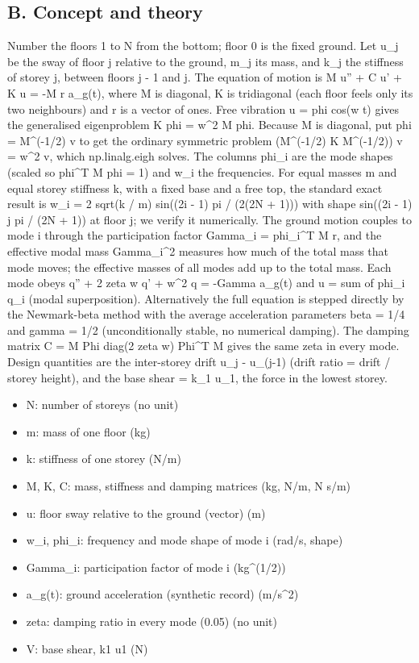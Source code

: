 \documentclass[11pt,a4paper]{article}
\begin{document}
\subsection*{B. Concept and theory}
Number the floors 1 to N from the bottom; floor 0 is the fixed ground. Let u\_j be the sway of floor j relative to the ground, m\_j its mass, and k\_j the stiffness of storey j, between floors j - 1 and j. The equation of motion is M u'' + C u' + K u = -M r a\_g(t), where M is diagonal, K is tridiagonal (each floor feels only its two neighbours) and r is a vector of ones. Free vibration u = phi cos(w t) gives the generalised eigenproblem K phi = w\textasciicircum{}2 M phi. Because M is diagonal, put phi = M\textasciicircum{}(-1/2) v to get the ordinary symmetric problem (M\textasciicircum{}(-1/2) K M\textasciicircum{}(-1/2)) v = w\textasciicircum{}2 v, which np.linalg.eigh solves. The columns phi\_i are the mode shapes (scaled so phi\textasciicircum{}T M phi = 1) and w\_i the frequencies. For equal masses m and equal storey stiffness k, with a fixed base and a free top, the standard exact result is w\_i = 2 sqrt(k / m) sin((2i - 1) pi / (2(2N + 1))) with shape sin((2i - 1) j pi / (2N + 1)) at floor j; we verify it numerically. The ground motion couples to mode i through the participation factor Gamma\_i = phi\_i\textasciicircum{}T M r, and the effective modal mass Gamma\_i\textasciicircum{}2 measures how much of the total mass that mode moves; the effective masses of all modes add up to the total mass. Each mode obeys q'' + 2 zeta w q' + w\textasciicircum{}2 q = -Gamma a\_g(t) and u = sum of phi\_i q\_i (modal superposition). Alternatively the full equation is stepped directly by the Newmark-beta method with the average acceleration parameters beta = 1/4 and gamma = 1/2 (unconditionally stable, no numerical damping). The damping matrix C = M Phi diag(2 zeta w) Phi\textasciicircum{}T M gives the same zeta in every mode. Design quantities are the inter-storey drift u\_j - u\_(j-1) (drift ratio = drift / storey height), and the base shear = k\_1 u\_1, the force in the lowest storey.

\begin{itemize}[nosep]
\item N: number of storeys (no unit)
\item m: mass of one floor (kg)
\item k: stiffness of one storey (N/m)
\item M, K, C: mass, stiffness and damping matrices (kg, N/m, N s/m)
\item u: floor sway relative to the ground (vector) (m)
\item w\_i, phi\_i: frequency and mode shape of mode i (rad/s, shape)
\item Gamma\_i: participation factor of mode i (kg\textasciicircum{}(1/2))
\item a\_g(t): ground acceleration (synthetic record) (m/s\textasciicircum{}2)
\item zeta: damping ratio in every mode (0.05) (no unit)
\item V: base shear, k1 u1 (N)
\end{itemize}
\end{document}
